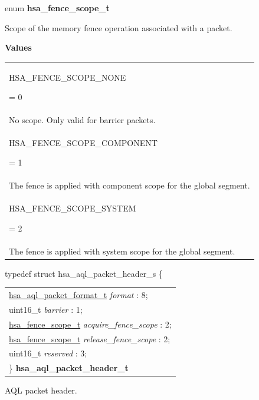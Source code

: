 \documentclass[final]{book}
\newcommand{\reffld}[1]{\textit{#1}}
\newcommand{\reftyp}[1]{#1}
\newcommand{\refenu}[1]{\reftyp{#1}}
\begin{document}
\noindent\begin{tcolorbox}[breakable,nobeforeafter,arc=0mm,colframe=white,colback=lightgray,left=0mm]
enum \hypertarget{group__aql_1ga6c1a86878de5b0f980202ad7e4e8d42a}{\textbf{hsa_fence_scope_t}}
\end{tcolorbox}
Scope of the memory fence operation associated with a packet.

\noindent\textbf{Values}\\[-5mm]
\begin{longtable}{@{\hspace{2em}}p{\linewidth-2em}}
\hspace{-2em}\hypertarget{group__aql_1gga6c1a86878de5b0f980202ad7e4e8d42aa5dc7b942cd56f91094a088435027be2c}{\refenu{HSA_FENCE_SCOPE_NONE}} = 0\\No scope. Only valid for barrier packets.\\[2mm]
\hspace{-2em}\hypertarget{group__aql_1gga6c1a86878de5b0f980202ad7e4e8d42aa9818589db02bc7c0639652eccd64c95d}{\refenu{HSA_FENCE_SCOPE_COMPONENT}} = 1\\The fence is applied with component scope for the global segment.\\[2mm]
\hspace{-2em}\hypertarget{group__aql_1gga6c1a86878de5b0f980202ad7e4e8d42aa6ecb203c10f12ec4bcf475d527c3a870}{\refenu{HSA_FENCE_SCOPE_SYSTEM}} = 2\\The fence is applied with system scope for the global segment.
\end{longtable}

\noindent\begin{tcolorbox}[breakable,nobeforeafter,arc=0mm,colframe=white,colback=lightgray,left=0mm]
typedef struct  hsa_aql_packet_header_s \{
\vspace{-3.5mm}\begin{longtable}{@{}p{\textwidth}}
\hspace{1.7em}\hyperlink{group__aql_1ga21e03ac6edb26e457468af5fe501b7ad}{hsa_aql_packet_format_t} \reffld{format} : 8;\\
\hspace{1.7em}uint16_t \reffld{barrier} : 1;\\
\hspace{1.7em}\hyperlink{group__aql_1ga6c1a86878de5b0f980202ad7e4e8d42a}{hsa_fence_scope_t} \reffld{acquire_fence_scope} : 2;\\
\hspace{1.7em}\hyperlink{group__aql_1ga6c1a86878de5b0f980202ad7e4e8d42a}{hsa_fence_scope_t} \reffld{release_fence_scope} : 2;\\
\hspace{1.7em}uint16_t \reffld{reserved} : 3;\\
\}  \hypertarget{group__aql_1ga92558e047d003985bae2558febd3dd40}{\textbf{hsa_aql_packet_header_t}}
\end{longtable}

\end{tcolorbox}
AQL packet header.
\end{document}
